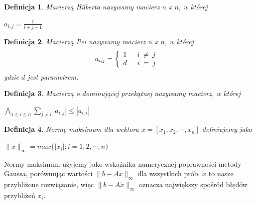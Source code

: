 \documentclass[a4paper,10pt]{article}
\newtheorem{definition}{Definicja}
\begin{document}
\begin{definition}
	Macierzą Hilberta nazywamy macierz $n$ x $n$, w której\\
    \begin{center}
    $a_{i,j} = \frac{1}{i+j-1}$
    \end{center}
\end{definition} 

\begin{definition}
	Macierzą Pei nazywamy macierz $n$ x $n$, w której\\
  \[
  a_{i,j} = \left\{
  \begin{array}{l l}
    1 \quad \texttt{ $i$ $\neq$ $j$ }\\
    d \quad \texttt{ $i$ $=$ $j$ }\\
  \end{array} \right.
  \]
    gdzie $d$ jest parametrem.
\end{definition}

\begin{definition}
    Macierzą o dominującej przekątnej nazywamy macierz, w której\\
    \begin{center}
    $ \bigwedge_{1 \leq i \leq n } \sum_{ j \neq i } |a_{i,j}| \leq |a_{i,i}| $
    \end{center}
\end{definition}


\begin{definition}
    Normę maksimum dla wektora $x = \left[ x_{1}, x_{2}, \cdots , x_{n} \right] $ definiujemy jako\\
    \begin{center}
        $ \|x\|_{\infty} = max \{|x_{i}| : i = 1, 2, \cdots , n \}$
    \end{center}
\end{definition}

Normy maksimum użyjemy jako wskaźnika numerycznej poprawności metody Gaussa,
porównując wartości $ \| b - A \tilde{x} \|_{\infty}$ dla wszystkich prób.
$\tilde x$ to nasze przybliżone rozwiązanie, więc $\| b - A \tilde{x} \|_{\infty}$ oznacza największy spośród błędów przybliżeń $x_i$.
\end{document}
